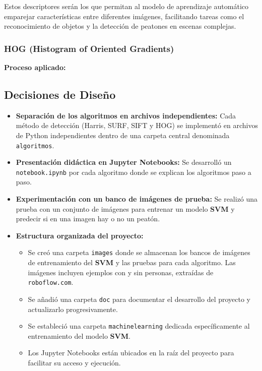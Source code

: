 \documentclass[a4paper]{article}
\begin{document}
Estos descriptores serán los que permitan al modelo de aprendizaje automático emparejar características entre diferentes imágenes, facilitando tareas como el reconocimiento de objetos y la detección de peatones en escenas complejas.


\subsubsection{HOG (Histogram of Oriented Gradients)}


\textbf{Proceso aplicado:}


\subsection{Decisiones de Diseño}

\begin{itemize}
\item \textbf{Separación de los algoritmos en archivos independientes:} Cada método de detección (Harris, SURF, SIFT y HOG) se implementó en archivos de Python independientes dentro de una carpeta central denominada \texttt{algoritmos}.
\item \textbf{Presentación didáctica en Jupyter Notebooks:} Se desarrolló un \texttt{notebook.ipynb} por cada algoritmo donde se explican los algoritmos paso a paso.
\item \textbf{Experimentación con un banco de imágenes de prueba:} Se realizó una prueba con un conjunto de imágenes para entrenar un modelo \textbf{SVM} y predecir si en una imagen hay o no un peatón.
\item \textbf{Estructura organizada del proyecto:}  
    \begin{itemize}
        \item Se creó una carpeta \texttt{images} donde se almacenan los bancos de imágenes de entrenamiento del \textbf{SVM} y las pruebas para cada algoritmo. Las imágenes incluyen ejemplos con y sin personas, extraídas de \texttt{roboflow.com}.
        \item Se añadió una carpeta \texttt{doc} para documentar el desarrollo del proyecto y actualizarlo progresivamente.
        \item Se estableció una carpeta \texttt{machinelearning} dedicada específicamente al entrenamiento del modelo \textbf{SVM}.
        \item Los Jupyter Notebooks están ubicados en la raíz del proyecto para facilitar su acceso y ejecución.
    \end{itemize}
\end{itemize}
\end{document}
